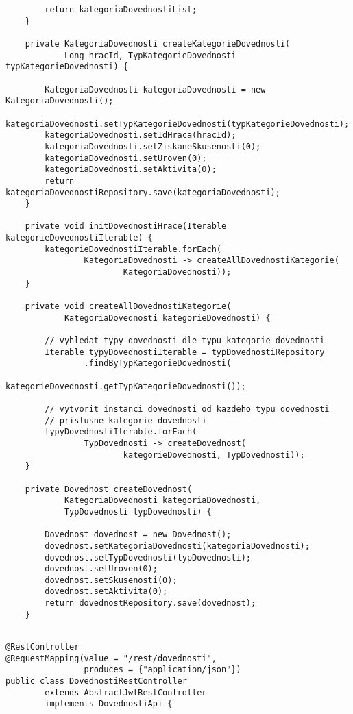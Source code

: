 \documentclass[twoside, 12pt]{article}
\begin{document}
{{\begin{lstlisting}
        return kategoriaDovednostiList;
    }

    private KategoriaDovednosti createKategorieDovednosti(
            Long hracId, TypKategorieDovednosti typKategorieDovednosti) {

        KategoriaDovednosti kategoriaDovednosti = new KategoriaDovednosti();
        kategoriaDovednosti.setTypKategorieDovednosti(typKategorieDovednosti);
        kategoriaDovednosti.setIdHraca(hracId);
        kategoriaDovednosti.setZiskaneSkusenosti(0);
        kategoriaDovednosti.setUroven(0);
        kategoriaDovednosti.setAktivita(0);
        return kategoriaDovednostiRepository.save(kategoriaDovednosti);
    }

    private void initDovednostiHrace(Iterable kategorieDovednostiIterable) {
        kategorieDovednostiIterable.forEach(
                KategoriaDovednosti -> createAllDovednostiKategorie(
                        KategoriaDovednosti));
    }

    private void createAllDovednostiKategorie(
            KategoriaDovednosti kategorieDovednosti) {

        // vyhledat typy dovednosti dle typu kategorie dovednosti
        Iterable typyDovednostiIterable = typDovednostiRepository
                .findByTypKategorieDovednosti(
                        kategorieDovednosti.getTypKategorieDovednosti());

        // vytvorit instanci dovednosti od kazdeho typu dovednosti
        // prislusne kategorie dovednosti
        typyDovednostiIterable.forEach(
                TypDovednosti -> createDovednost(
                        kategorieDovednosti, TypDovednosti));
    }

    private Dovednost createDovednost(
            KategoriaDovednosti kategoriaDovednosti,
            TypDovednosti typDovednosti) {

        Dovednost dovednost = new Dovednost();
        dovednost.setKategoriaDovednosti(kategoriaDovednosti);
        dovednost.setTypDovednosti(typDovednosti);
        dovednost.setUroven(0);
        dovednost.setSkusenosti(0);
        dovednost.setAktivita(0);
        return dovednostRepository.save(dovednost);
    }


\end{lstlisting}

\clearpage


\begin{lstlisting}
@RestController
@RequestMapping(value = "/rest/dovednosti",
                produces = {"application/json"})
public class DovednostiRestController
        extends AbstractJwtRestController
        implements DovednostiApi {


\end{lstlisting}}}
\end{document}
